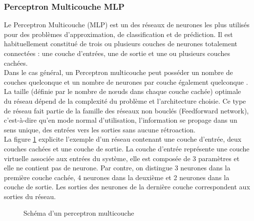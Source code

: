 \subsubsection{Perceptron Multicouche MLP}
Le Perceptron Multicouche (MLP) est un des réseaux de neurones les plus utilisés pour des problèmes d’approximation, de classification et de prédiction. Il est habituellement constitué de trois ou plusieurs couches de neurones totalement connectées : une couche d’entrées, une de sortie et une ou plusieurs couches cachées.\\ 

Dans le cas général, un Perceptron multicouche peut posséder un nombre de couches quelconque et un nombre de neurones par couche également quelconque \citep{parizeau2004perceptron}. La taille (définie par le nombre de nœuds dans chaque couche cachée) optimale du réseau dépend de la complexité du problème et l’architecture choisie. Ce type de réseau fait partie de la famille des réseaux non bouclés (Feedforward network), c’est-à-dire qu’en mode normal d’utilisation, l’information se propage dans un sens unique, des entrées vers les sorties sans aucune rétroaction.\\

La figure \ref{MLP_fig} explicite l’exemple d’un réseau contenant une couche d’entrée, deux couches cachées et une couche de sortie. La couche d’entrée représente une couche virtuelle associée aux entrées du système, elle est composée de 3 paramètres et elle ne contient pas de neurone. Par contre, on distingue 3 neurones dans la première couche cachée, 4 neurones dans la deuxième et 2 neurones dans la couche de sortie. Les sorties des neurones
de la dernière couche correspondent aux sorties du réseau.

\begin{figure}[!htb]
        \caption{Schéma d'un perceptron multicouche}
        \label{MLP_fig}
\end{figure}


